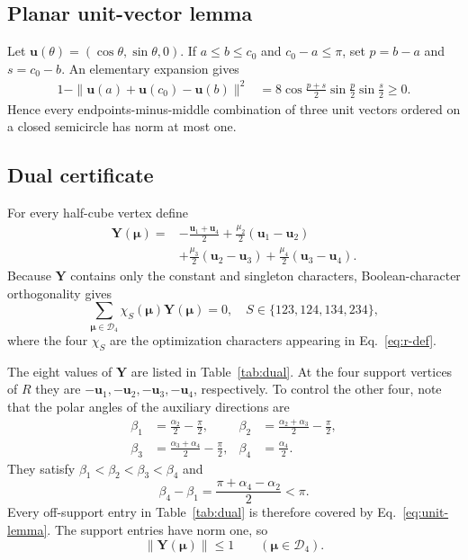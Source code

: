 \documentclass[aps,pra,reprint,superscriptaddress,nofootinbib,longbibliography]{revtex4-2}
\newcommand{\bmnu}{\bm{\mu}}
\newcommand{\bu}{\bm u}
\begin{document}
\subsection{Planar unit-vector lemma}

Let $\bu(\theta)=(\cos\theta,\sin\theta,0)$.  If
$a\leq b\leq c_0$ and $c_0-a\leq\pi$, set $p=b-a$ and $s=c_0-b$.
An elementary expansion gives
\begin{align}
 1-\|\bu(a)+\bu(c_0)-\bu(b)\|^2
 &=8\cos\frac{p+s}{2}\sin\frac p2\sin\frac s2
 \geq0.
 \label{eq:unit-lemma}
\end{align}
Hence every endpoints-minus-middle combination of three unit vectors ordered
on a closed semicircle has norm at most one.

\subsection{Dual certificate}

For every half-cube vertex define
\begin{align}
 \bm Y(\bmnu)={}&-\frac{\bu_1+\bu_4}{2}
 +\frac{\mu_2}{2}(\bu_1-\bu_2)\nonumber\\
 &+\frac{\mu_3}{2}(\bu_2-\bu_3)
 +\frac{\mu_4}{2}(\bu_3-\bu_4).
 \label{eq:dual}
\end{align}
Because $\bm Y$ contains only the constant and singleton characters,
Boolean-character orthogonality gives
\begin{equation}
 \sum_{\bmnu\in\mathcal D_4}\chi_S(\bmnu)\bm Y(\bmnu)=0,
 \quad S\in\{123,124,134,234\},
 \label{eq:dual-orthogonality}
\end{equation}
where the four $\chi_S$ are the optimization characters appearing in
Eq.~\eqref{eq:r-def}.

The eight values of $\bm Y$ are listed in Table~\ref{tab:dual}.  At the four
support vertices of $R$ they are $-\bu_1,-\bu_2,-\bu_3,-\bu_4$,
respectively.  To control the other four, note that the polar angles of the
auxiliary directions are
\begin{align}
 \beta_1&=\frac{\alpha_2}{2}-\frac\pi2,&
 \beta_2&=\frac{\alpha_2+\alpha_3}{2}-\frac\pi2,\nonumber\\
 \beta_3&=\frac{\alpha_3+\alpha_4}{2}-\frac\pi2,&
 \beta_4&=\frac{\alpha_4}{2}.
 \label{eq:beta}
\end{align}
They satisfy $\beta_1<\beta_2<\beta_3<\beta_4$ and
\begin{equation}
 \beta_4-\beta_1=\frac{\pi+\alpha_4-\alpha_2}{2}<\pi.
 \label{eq:beta-span}
\end{equation}
Every off-support entry in Table~\ref{tab:dual} is therefore covered by
Eq.~\eqref{eq:unit-lemma}.  The support entries have norm one, so
\begin{equation}
 \|\bm Y(\bmnu)\|\leq1\qquad(\bmnu\in\mathcal D_4).
 \label{eq:dual-feasible}
\end{equation}
\end{document}
